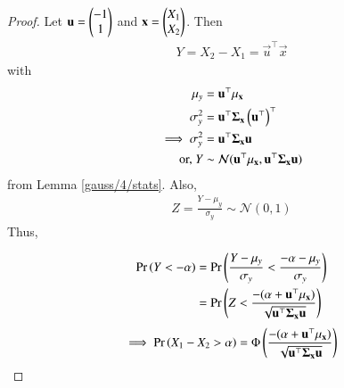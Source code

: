\begin{proof}
   Let $\mathbf{u}=\begin{pmatrix}-1\\
                       1\end{pmatrix}$ and $\mathbf{x}=\begin{pmatrix}X_1\\
                                           X_2\end{pmatrix}$.  Then 
   \begin{align}
       Y = X_2-X_1=\vec{u}^{\top}\vec{x}
   \end{align}
with 
   \begin{align}
       \mu_{y}&=\mathbf{u}^{\top}\mathbf{\mu_{\mathbf{x}}} \\
       \sigma^2_{y}&=\mathbf{u}^{\top}\mathbf{\Sigma_{\mathbf{x}}}\left(\mathbf{u}^{\top}\right)^{\top}\\
       \implies \sigma^2_{y}&=\mathbf{u}^{\top}\mathbf{\Sigma_{\mathbf{x}}}\mathbf{u}
       \\
       \text{or, } Y&\sim\mathcal{N}(\mathbf{u}^{\top}\mathbf{\mu_{\mathbf{x}}},\mathbf{u}^{\top}\mathbf{\Sigma_{\mathbf{x}}}\mathbf{u})
   \end{align}
   from Lemma     \ref{gauss/4/stats}.  Also, 
   \begin{align}
    Z  = \frac{Y-\mu_y}{\sigma_y} \sim \mathcal{N}(0,1) 
   \end{align}
   Thus, 
   
   \begin{align}
       \Pr\left(Y<-\alpha\right)&=\Pr\left(\frac{Y-\mu_y}{\sigma_y}<\frac{-\alpha-\mu_y}{\sigma_y}\right)\\
       &=\Pr\left(Z<\frac{-(\alpha+\mathbf{u}^{\top}\mathbf{\mu_{\mathbf{x}})}}{\sqrt{\mathbf{u}^{\top}\mathbf{\Sigma_{\mathbf{x}}}\mathbf{u}}}\right)
    \end{align}
    \begin{align}
       \implies  \Pr\left(X_1-X_2>\alpha\right)=\Phi\left(\frac{-(\alpha+\mathbf{u}^{\top}\mathbf{\mu_{\mathbf{x}})}}{\sqrt{\mathbf{u}^{\top}\mathbf{\Sigma_{\mathbf{x}}}\mathbf{u}}}\right)
       \label{gauss/4/temp}
   \end{align}
\end{proof}

